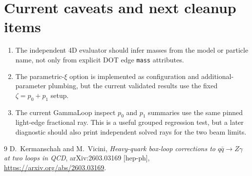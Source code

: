 \documentclass[11pt]{article}
\begin{document}
\section{Current caveats and next cleanup items}

\begin{enumerate}[leftmargin=2em]
  \item The independent 4D evaluator should infer masses from the model or
        particle name, not only from explicit DOT edge \texttt{mass}
        attributes.
  \item The parametric-\(\xi\) option is implemented as configuration and
        additional-parameter plumbing, but the current validated results use
        the fixed \(\zeta=p_0+p_1\) setup.
  \item The current GammaLoop inspect \(p_0\) and \(p_1\) summaries use the
        same pinned light-edge fractional ray.  This is a useful grouped
        regression test, but a later diagnostic should also print independent
        solved rays for the two beam limits.
\end{enumerate}

\begin{thebibliography}{9}
D.~Kermanschah and M.~Vicini,
\emph{Heavy-quark box-loop corrections to \(q\bar q \to Z\gamma\) at two loops in QCD},
arXiv:2603.03169 [hep-ph],
\url{https://arxiv.org/abs/2603.03169}.
\end{thebibliography}
\end{document}
